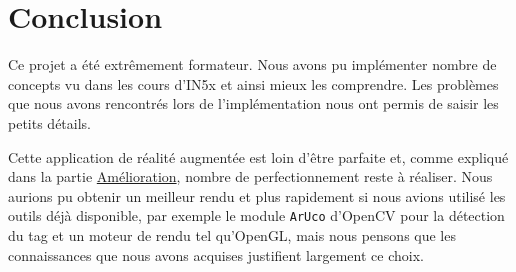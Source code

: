 \part*{Conclusion}

Ce projet a été extrêmement formateur. Nous avons pu implémenter nombre de concepts vu dans les cours d'IN5x et ainsi mieux les comprendre. Les problèmes que nous avons rencontrés lors de l'implémentation nous ont permis de saisir les petits détails.

Cette application de réalité augmentée est loin d'être parfaite et, comme expliqué dans la partie \href{part:ameliorations}{Amélioration}, nombre de perfectionnement reste à réaliser. Nous aurions pu obtenir un meilleur rendu et plus rapidement si nous avions utilisé les outils déjà disponible, par exemple le module \verb|ArUco| d'OpenCV pour la détection du tag et un moteur de rendu tel qu'OpenGL, mais nous pensons que les connaissances que nous avons acquises justifient largement ce choix. 